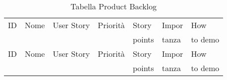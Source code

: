 \renewcommand{\arraystretch}{2} 
\begin{center}
\centering
\begin{longtable}{
  >{\centering\arraybackslash}p{0.5cm}|
  >{\raggedright\arraybackslash}m{2.7cm}|
  >{\raggedright\arraybackslash}m{3.5cm}|
  >{\centering\arraybackslash}p{1.2cm}|
  >{\centering\arraybackslash}p{0.9cm}|
  >{\centering\arraybackslash}p{0.9cm}|
  >{\raggedright\arraybackslash}m{3.5cm}
}
  \caption{Tabella Product Backlog }\label{tab:ProductBackLogTable}\\
  \hline
  ID & Nome & User Story & Priorità & Story & Impor &How \\
     &      & &          &points &tanza  & to demo\\
  \hline
  \endfirsthead

  \hline
  ID & Nome & User Story& Priorità & Story & Impor &How \\
     &      & &          &points &tanza  & to demo\\
  \hline
  \endhead


\end{longtable}
\end{center}
